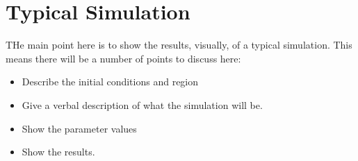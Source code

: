 \section{Typical Simulation}

THe main point here is to show the results, visually, of a typical simulation.
This means there will be a number of points to discuss here:
\begin{itemize}
  \item Describe the initial conditions and region
  \item Give a verbal description of what the simulation will be.
  \item Show the parameter values
  \item Show the results.
\end{itemize}

%
%
%

